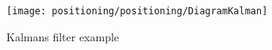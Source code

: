 \begin{figure}[H]
	\centering
	\texttt{[image: positioning/positioning/DiagramKalman]}
	\caption{Kalmans filter example}
	\label{fig:Kalmanfilter}
\end{figure}

